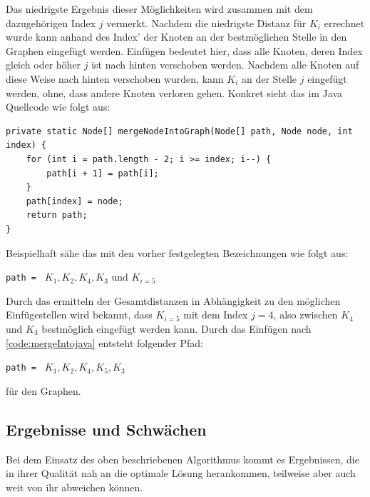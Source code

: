 Das niedrigste Ergebnis dieser Möglichkeiten wird zusammen mit dem dazugehörigen Index $j$ vermerkt. 
Nachdem die niedrigste Distanz für $K_i$ errechnet wurde kann anhand des Index' der Knoten an der bestmöglichen Stelle in den Graphen eingefügt werden. 
Einfügen bedeutet hier, dass alle Knoten, deren Index gleich oder höher $j$ ist nach hinten verschoben werden. 
Nachdem alle Knoten auf diese Weise nach hinten verschoben wurden, kann $K_i$ an der Stelle $j$ eingefügt werden, ohne, dass andere Knoten verloren gehen. 
Konkret sieht das im Java Quellcode wie folgt aus:
\begin{lstlisting}[caption={Einfügen von Knoten in einen bestehenden Graph}, label={code:mergeIntojava}]
private static Node[] mergeNodeIntoGraph(Node[] path, Node node, int index) {
    for (int i = path.length - 2; i >= index; i--) {
        path[i + 1] = path[i];
    }
    path[index] = node;
    return path;
}
\end{lstlisting}
Beispielhaft sähe das mit den vorher festgelegten Bezeichnungen wie folgt aus: 
\begin{addmargin}[1em]{2em}
\lstinline{path = } $K_1, K_2, K_4, K_3$ und $K_{i = 5}$ 
\end{addmargin}
Durch das ermitteln der Gesamtdistanzen in Abhängigkeit zu den möglichen Einfügestellen wird bekannt, dass $K_{i=5}$ mit dem Index $j=4$, also zwischen $K_4$ und $K_3$ bestmöglich eingefügt werden kann. 
Durch das Einfügen nach \vref{code:mergeIntojava} entsteht folgender Pfad:
\begin{addmargin}[1em]{2em}
\lstinline{path = } $K_1, K_2, K_4, K_5, K_3$
\end{addmargin}
für den Graphen.

\subsection{Ergebnisse und Schwächen} \label{insert-first-erg}
Bei dem Einsatz des oben beschriebenen Algorithmus kommt es Ergebnissen, die in ihrer Qualität nah an die optimale Lösung herankommen, teilweise aber auch weit von ihr abweichen können.  

